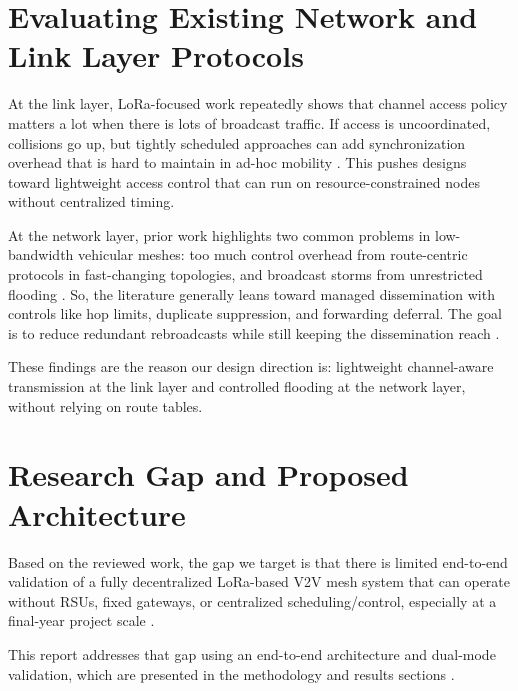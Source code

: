 \section{Evaluating Existing Network and Link Layer Protocols}

At the link layer, LoRa-focused work repeatedly shows that channel access policy matters a lot when there is
lots of broadcast traffic. If access is uncoordinated, collisions go up, but tightly scheduled approaches can
add synchronization overhead that is hard to maintain in ad-hoc mobility \cite{lora_mesh_iot,routing_mesh_2020}.
This pushes designs toward lightweight access control that can run on resource-constrained nodes without
centralized timing.

At the network layer, prior work highlights two common problems in low-bandwidth vehicular meshes: too much
control overhead from route-centric protocols in fast-changing topologies, and broadcast storms from
unrestricted flooding \cite{routing_mesh_2020,vdtn_routing_eval}. So, the literature generally
leans toward managed dissemination with controls like hop limits, duplicate suppression, and forwarding
deferral. The goal is to reduce redundant rebroadcasts while still keeping the dissemination reach
\cite{lora_reliable_v2v_2025,lora_mesh_emergency}.

These findings are the reason our design direction is: lightweight channel-aware transmission at the link
layer and controlled flooding at the network layer, without relying on route tables.

\section{Research Gap and Proposed Architecture}

Based on the reviewed work, the gap we target is that there is limited end-to-end validation of a fully
decentralized LoRa-based V2V mesh system that can operate without RSUs, fixed gateways, or centralized
scheduling/control, especially at a final-year project scale \cite{lora_reliable_v2v_2025,routing_mesh_2020}.

This report addresses that gap using an end-to-end architecture and dual-mode validation, which are presented
in the methodology and results sections \cite{lora_mesh_emergency,lora_reliable_v2v_2025}.

